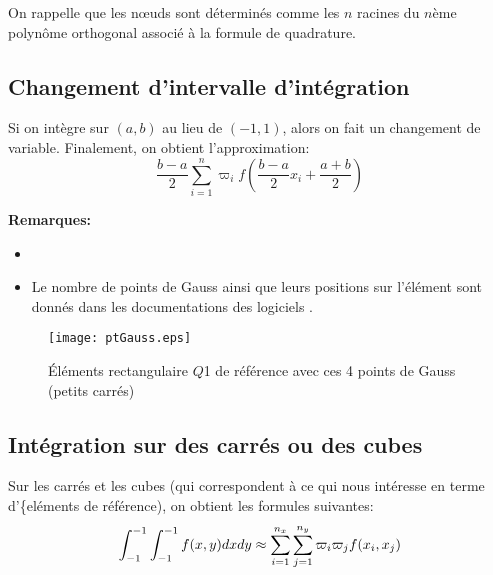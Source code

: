 On rappelle que les nœuds sont déterminés comme les $n$ racines du $n$ème 
polynôme orthogonal associé à la formule de quadrature.

\medskip
{}

\medskip
\subsection*{Changement d'intervalle d'intégration}

Si on intègre sur $(a,b)$ au lieu de $(-1,1)$, alors on fait un changement de
variable.
Finalement, on obtient l'approximation:
\begin{equation}   \frac{b-a}{2} \sum_{i=1}^n \varpi_i f\left(\frac{b-a}{2}x_i + \frac{a+b}{2}\right)  \end{equation}

\medskip
\textbf{Remarques:}
\begin{itemize}
\item {}
\item Le nombre de points de Gauss ainsi que leurs positions sur l'élément sont donnés dans 
les documentations des logiciels .
\end{itemize}

\begin{figure}[ht]
\begin{center}
\texttt{[image: ptGauss.eps]}
\end{center}
\caption{\label{ptGauss} Éléments rectangulaire $Q$1 de référence avec ces 4 points de Gauss (petits carrés)}
\end{figure}

\medskip
\subsection*{Intégration sur des carrés ou des cubes}

Sur les carrés et les cubes (qui correspondent à ce qui nous intéresse en terme
d'\{eléments de référence), on obtient les formules suivantes:
\begin{equation} \int_{-1}^{-1}\int_{-1}^{-1} f(x,y)dxdy \approx
\displaystyle\sum_{i=1}^{n_x}\displaystyle\sum_{j=1}^{n_y} \varpi_i\varpi_j f(x_i,x_j)\end{equation}

